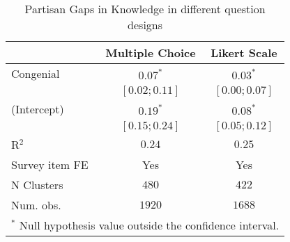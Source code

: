 \begin{table}
   \caption{Partisan Gaps in Knowledge in different question designs}
\begin{center}
 \begin{tabular}{l c c}
\hline
 & Multiple Choice & Likert Scale \\
\hline
Congenial      & $0.07^{*}$      & $0.03^{*}$      \\
               & $ [0.02; 0.11]$ & $ [0.00; 0.07]$ \\
(Intercept)    & $0.19^{*}$      & $0.08^{*}$      \\
               & $ [0.15; 0.24]$ & $ [0.05; 0.12]$ \\
\hline
R$^2$          & $0.24$          & $0.25$          \\
Survey item FE & Yes             & Yes             \\
N Clusters     & $480$           & $422$           \\
Num. obs.      & $1920$          & $1688$          \\
\hline
\multicolumn{3}{l}{\scriptsize{$^*$ Null hypothesis value outside the confidence interval.}}
  \end{tabular}
\end{center}
\end{table}
